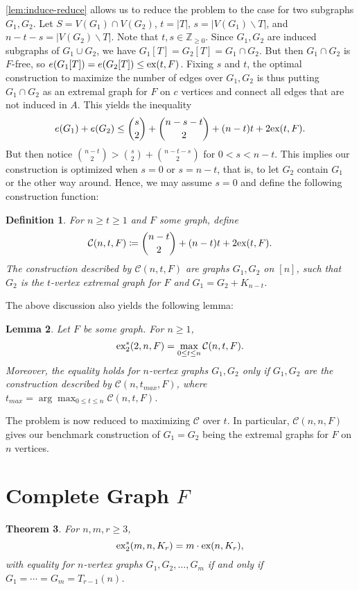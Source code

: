 \documentclass[10pt, reqno]{report}
\newtheorem{theorem}{Theorem}[chapter]
\newtheorem{lemma}[theorem]{Lemma}
\newtheorem{definition}[theorem]{Definition}
\newcommand*{\Z}{\mathbb{Z}}
\newcommand*{\ex}{\textnormal{ex}}
\newcommand*{\dex}{\textnormal{ex}_2}
\newcommand*{\con}{\mathcal{C}}
\begin{document}
\cref{lem:induce-reduce} allows us to reduce the problem to the case for two subgraphs $G_1, G_2$. Let $S = V(G_1) \cap V(G_2)$, $t = |T|$, $s = |V(G_1) \backslash T|$, and $n - t - s = |V(G_2) \backslash T|$. Note that $t, s \in \Z_{\geq 0}$. Since $G_1, G_2$ are induced subgraphs of $G_1 \cup G_2$, we have $G_1[T] = G_2[T] = G_1 \cap G_2$. But then $G_1 \cap G_2$ is $F$-free, so $e(G_1[T]) = e(G_2[T]) \leq \ex(t, F)$. Fixing $s$ and $t$, the optimal construction to maximize the number of edges over $G_1, G_2$ is thus putting $G_1 \cap G_2$ as an extremal graph for $F$ on $c$ vertices and connect all edges that are not induced in $A$. This yields the inequality
\[
  e(G_1) + e(G_2) \leq \binom{s}{2} + \binom{n - s - t}{2} + (n - t)t + 2\ex(t, F).
\]
But then notice $\binom{n - t}{2} > \binom{s}{2} + \binom{n - t - s}{2}$ for $0 < s < n - t$. This implies our construction is optimized when $s = 0$ or $s = n - t$, that is, to let $G_2$ contain $G_1$ or the other way around. Hence, we may assume $s = 0$ and define the following construction function:

\begin{definition}
  For $n \geq t \geq 1$ and $F$ some graph, define 
  \[
    \con(n, t, F) \coloneq \binom{n - t}{2} + (n - t)t + 2\ex(t, F).
  \]
  The construction described by $\con(n, t, F)$ are graphs $G_1, G_2$ on $[n]$, such that $G_2$ is the $t$-vertex extremal graph for $F$ and $G_1 = G_2 + K_{n - t}$. 
\end{definition}

The above discussion also yields the following lemma:

\begin{lemma}\label{lem:optimize-con}
  Let $F$ be some graph. For $n \geq 1$,
  \[
    \dex^*(2, n, F) = \max_{0 \leq t \leq n} \con(n, t, F).
  \]
  Moreover, the equality holds for $n$-vertex graphs $G_1, G_2$ only if $G_1, G_2$ are the construction described by $\con(n, t_{max}, F)$, where $t_{max} = \arg\max_{0 \leq t \leq n} \con(n, t, F)$.
\end{lemma}

The problem is now reduced to maximizing $\con$ over $t$. In particular, $\con(n, n, F)$ gives our benchmark construction of $G_1 = G_2$ being the extremal graphs for $F$ on $n$ vertices. 

\section{Complete Graph $F$}

\begin{theorem}\label{thm:induce-complete}
  For $n, m, r \geq 3$, 
  \[
    \dex^*(m, n, K_{r}) = m \cdot \ex(n, K_{r}),
  \]
  with equality for $n$-vertex graphs $G_1, G_2, \ldots, G_m$ if and only if $G_1 = \cdots = G_m = T_{r - 1}(n)$.
\end{theorem}
\end{document}
